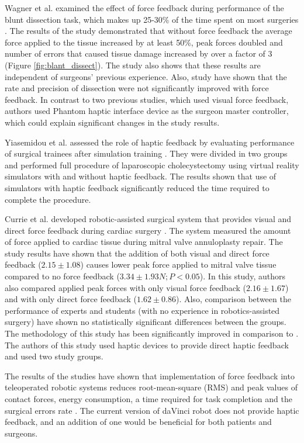Wagner et al. examined the effect of force feedback during performance of the blunt dissection task, which makes up 25-30\% of the time spent on most surgeries  \cite{wagner_benefit_2007}.  The results of the study demonstrated that without force feedback the average force applied to the tissue increased by at least 50\%, peak forces doubled and number of errors that caused tissue damage increased by over a factor of 3 (Figure \ref{fig:blant_dissect}). The study also shows that these results are independent of surgeons' previous experience. Also, study have shown that the rate and precision of dissection were not significantly improved with force feedback. In contrast to two previous studies, which used visual force feedback, authors used Phantom haptic interface device as the surgeon master controller, which could explain significant changes in the study results. 

Yiasemidou et al. assessed the role of haptic feedback by evaluating performance of surgical trainees after simulation training \cite{yiasemidou_faster_2011}. They were divided in two groups and performed full procedure of laparoscopic cholecystectomy using virtual reality simulators with and without haptic feedback.  The results shown that use of simulators with haptic feedback significantly reduced the time required to complete the procedure.

Currie et al. developed robotic-assisted surgical system that provides visual and direct force feedback during cardiac surgery \cite{currie_role_2017}. The system measured the amount of force applied to cardiac tissue during mitral valve annuloplasty repair. The study results have shown that the addition of both visual and direct force feedback ($2.15 \pm 1.08$) causes lower peak force applied to mitral valve tissue compared to no force feedback ($3.34 \pm 1.93 N; P < 0.05$). In this study, authors also compared applied peak forces with only visual force feedback ($2.16 \pm 1.67$) and with only direct force feedback ($1.62 \pm 0.86$). Also, comparison between the performance of experts and students (with no experience in robotics-assisted surgery) have shown no statistically significant differences between the groups. The methodology of this study has been significantly improved in comparison to \cite{bethea_application_2004}. The authors of this study\cite{currie_role_2017} used haptic devices to provide direct haptic feedback and used two study groups.

The results of the studies \cite{wagner_benefit_2007, yiasemidou_faster_2011, currie_role_2017} have shown that implementation of force feedback into teleoperated robotic systems reduces root-mean-square (RMS) and peak values of contact forces, energy consumption, a time required for task completion and the surgical errors rate \cite{tavakoli_haptics_2008}. The current version of daVinci robot does not provide haptic feedback, and an addition of one would be beneficial for both patients and surgeons.


